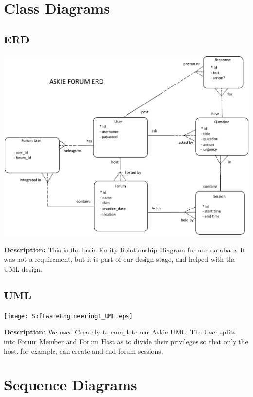\documentclass[12pt]{article}
\begin{document}
\section{Class Diagrams}
\subsection{ERD}
    \includegraphics[width=\textwidth]{SoftwareEngineering1_ERD.eps}
\begin{flushleft}
\textbf{Description:} This is the basic Entity Relationship Diagram for our database. It was not a requirement, but it is part of our design stage, and helped with the UML design.
\end{flushleft}
\subsection{UML}
    \texttt{[image: SoftwareEngineering1\_UML.eps]}
\begin{flushleft}
\textbf{Description:} We used Creately to complete our Askie UML. The User splits into Forum Member and Forum Host as to divide their privileges so that only the host, for example, can create and end forum sessions.
\end{flushleft}



\section{Sequence Diagrams}
\end{document}
